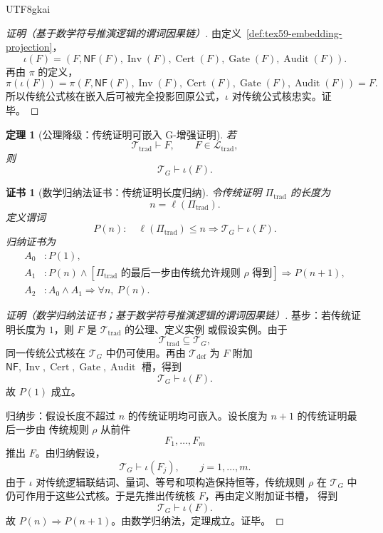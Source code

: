\documentclass[12pt]{article}
\newtheorem{theorem}{定理}[section]
\newtheorem{Certificate}{证书}[section]
\newcommand{\NF}{\mathsf{NF}}
\DeclareMathOperator{\Cert}{Cert}
\DeclareMathOperator{\Audit}{Audit}
\DeclareMathOperator{\Gate}{Gate}
\DeclareMathOperator{\Inv}{Inv}
\begin{document}
\begin{CJK*}{UTF8}{gkai}
\begin{proof}[证明（基于数学符号推演逻辑的谓词因果链）]
由定义~\ref{def:tex59-embedding-projection}，
\[
  \iota(F)=
  (F,\NF(F),\Inv(F),\Cert(F),\Gate(F),\Audit(F)).
\]
再由 \(\pi\) 的定义，
\[
  \pi(\iota(F))
  =
  \pi(F,\NF(F),\Inv(F),\Cert(F),\Gate(F),\Audit(F))
  =
  F.
\]
所以传统公式核在嵌入后可被完全投影回原公式，\(\iota\) 对传统公式核忠实。证毕。
\end{proof}

\begin{theorem}[公理降级：传统证明可嵌入 G-增强证明]
\label{thm:tex59-traditional-proof-embedding}
若
\[
  \mathcal T_{\mathrm{trad}}\vdash F,
  \qquad
  F\in\mathcal L_{\mathrm{trad}},
\]
则
\[
  \mathcal T_G\vdash \iota(F).
\]
\end{theorem}

\begin{Certificate}[数学归纳法证书：传统证明长度归纳]
\label{cert:tex59-traditional-proof-embedding}
令传统证明 \(\Pi_{\mathrm{trad}}\) 的长度为
\[
  n=\ell(\Pi_{\mathrm{trad}}).
\]
定义谓词
\[
  P(n):\quad
  \ell(\Pi_{\mathrm{trad}})\le n
  \Rightarrow
  \mathcal T_G\vdash\iota(F).
\]
归纳证书为
\[
\begin{aligned}
  A_0 &: P(1),\\
  A_1 &: P(n)\wedge
         \left[
         \Pi_{\mathrm{trad}}\text{ 的最后一步由传统允许规则 }\rho
         \text{ 得到}
         \right]
         \Rightarrow P(n+1),\\
  A_2 &: A_0\wedge A_1
         \Rightarrow
         \forall n,\ P(n).
\end{aligned}
\]
\end{Certificate}

\begin{proof}[证明（数学归纳法证书；基于数学符号推演逻辑的谓词因果链）]
基步：若传统证明长度为 \(1\)，则 \(F\) 是 \(\mathcal T_{\mathrm{trad}}\) 的公理、定义实例
或假设实例。由于
\[
  \mathcal T_{\mathrm{trad}}\subseteq \mathcal T_G,
\]
同一传统公式核在 \(\mathcal T_G\) 中仍可使用。再由 \(\mathcal T_{\mathrm{def}}\) 为 \(F\)
附加 \(\NF,\Inv,\Cert,\Gate,\Audit\) 槽，得到
\[
  \mathcal T_G\vdash\iota(F).
\]
故 \(P(1)\) 成立。

归纳步：假设长度不超过 \(n\) 的传统证明均可嵌入。设长度为 \(n+1\) 的传统证明最后一步由
传统规则 \(\rho\) 从前件
\[
  F_1,\ldots,F_m
\]
推出 \(F\)。由归纳假设，
\[
  \mathcal T_G\vdash\iota(F_j),
  \qquad j=1,\ldots,m.
\]
由于 \(\iota\) 对传统逻辑联结词、量词、等号和项构造保持恒等，传统规则 \(\rho\) 在
\(\mathcal T_G\) 中仍可作用于这些公式核。于是先推出传统核 \(F\)，再由定义附加证书槽，
得到
\[
  \mathcal T_G\vdash\iota(F).
\]
故 \(P(n)\Rightarrow P(n+1)\)。由数学归纳法，定理成立。证毕。
\end{proof}


\end{CJK*}
\end{document}
